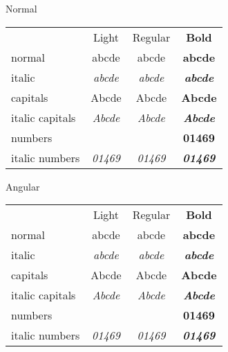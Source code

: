 \documentclass[varwidth]{standalone}
\newcommand*\spA{abcde}
\newcommand*\spB{01469}
\newcommand*\spr[1][\spA]{& #1 & #1 & #1 \\}
\begin{document}
Normal
\begin{tabular}{
		>{}l
		>{\comicneuelight}c
		>{\comicneue}c
		>{\comicneue\bfseries}c }
	& Light & Regular & Bold \\
	normal               \spr
	italic               \spr[\itshape\spA]
	capitals             \spr[\MakeUppercase\spA]
	italic capitals      \spr[\itshape\MakeUppercase\spA]
	numbers              \spr[\spB]
	italic numbers       \spr[\itshape\spB]
\end{tabular}

\comicneueangular
Angular
\begin{tabular}{
		>{}l
		>{\comicneueangularlight}c
		>{\comicneueangular}c
		>{\comicneueangular\bfseries}c }
	& Light & Regular & Bold \\
	normal               \spr
	italic               \spr[\itshape\spA]
	capitals             \spr[\MakeUppercase\spA]
	italic capitals      \spr[\itshape\MakeUppercase\spA]
	numbers              \spr[\spB]
	italic numbers       \spr[\itshape\spB]
\end{tabular}
\end{document}
